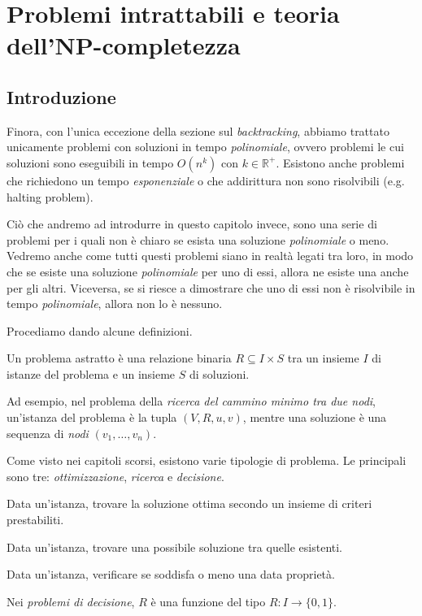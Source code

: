 \chapter{Problemi intrattabili e teoria dell'NP-completezza}
\section{Introduzione}
Finora, con l'unica eccezione della sezione sul \emph{backtracking}, abbiamo
trattato unicamente problemi con soluzioni in tempo \emph{polinomiale}, ovvero
problemi le cui soluzioni sono eseguibili in tempo $O(n^k)$ con $k\in\mathbb{R}^+$.
Esistono anche problemi che richiedono un tempo \emph{esponenziale} o che
addirittura non sono risolvibili (e.g. halting problem).

Ciò che andremo ad introdurre in questo capitolo invece, sono una serie di
problemi per i quali non è chiaro se esista una soluzione \emph{polinomiale} o
meno. Vedremo anche come tutti questi problemi siano in realtà legati tra loro,
in modo che se esiste una soluzione \emph{polinomiale} per uno di essi, allora ne
esiste una anche per gli altri. Viceversa, se si riesce a dimostrare che uno
di essi non è risolvibile in tempo \emph{polinomiale}, allora non lo è nessuno.

\bigskip\noindent
Procediamo dando alcune definizioni.

\begin{definition}
    Un problema astratto è una relazione binaria $R\subseteq I\times S$ tra un
    insieme $I$ di istanze del problema e un insieme $S$ di soluzioni.
\end{definition}
\begin{note}
    Ad esempio, nel problema della \emph{ricerca del cammino minimo tra due
    nodi}, un'istanza del problema è la tupla $(V,R,u,v)$, mentre una soluzione
    è una sequenza di \emph{nodi} $(v_1,\dots,v_n)$.
\end{note}

\noindent
Come visto nei capitoli scorsi, esistono varie tipologie di problema. Le
principali sono tre: \emph{ottimizzazione}, \emph{ricerca} e \emph{decisione}.

\begin{definition}
    Data un'istanza, trovare la soluzione ottima secondo un insieme di criteri
    prestabiliti.
\end{definition}
\begin{definition}
    Data un'istanza, trovare una possibile soluzione tra quelle esistenti.
\end{definition}
\begin{definition}
    Data un'istanza, verificare se soddisfa o meno una data proprietà.
\end{definition}
\begin{note}
    Nei \emph{problemi di decisione}, $R$ è una funzione del tipo $R:I\to\{0,1\}$.
\end{note}

